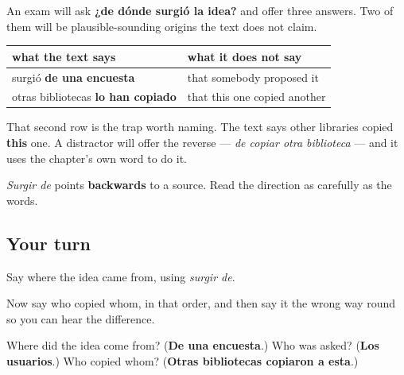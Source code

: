 \begin{grammarlens}[title={Grammar Lens: the question is about the source, not the author}]
An exam will ask \textbf{¿de dónde surgió la idea?} and offer three answers. Two of them will be plausible-sounding origins the text does not claim.

\noindent
\begin{tabularx}{\linewidth}{@{}>{\raggedright\arraybackslash}X>{\raggedright\arraybackslash}X@{}}
\toprule
\textbf{what the text says} & \textbf{what it does not say} \\
\midrule
surgió \textbf{de una encuesta} & that somebody proposed it \\
otras bibliotecas \textbf{lo han copiado} & that this one copied another \\
\bottomrule
\end{tabularx}

That second row is the trap worth naming. The text says other libraries copied \textbf{this} one. A distractor will offer the reverse — \emph{de copiar otra biblioteca} — and it uses the chapter's own word to do it.

\emph{Surgir de} points \textbf{backwards} to a source. Read the direction as carefully as the words.
\end{grammarlens}

\subsection*{Your turn}
Say where the idea came from, using \emph{surgir de}.

Now say who copied whom, in that order, and then say it the wrong way round so you can hear the difference.

\begin{tcolorbox}[breakable,colback=teal!4,colframe=teal!35!black,title={Before you move on}]
Where did the idea come from? (\textbf{De una encuesta}.) Who was asked? (\textbf{Los usuarios}.) Who copied whom? (\textbf{Otras bibliotecas copiaron a esta}.)
\end{tcolorbox}
